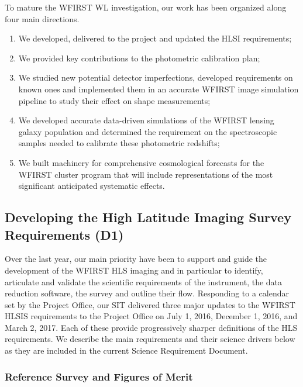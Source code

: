 \begin{summary}
To mature the WFIRST WL investigation, our work has been organized along four main
directions.
\begin{enumerate}
  \item We developed, delivered to the project and
updated the HLSI requirements;
\item We provided key contributions to the
photometric calibration plan;
\item We studied new potential detector imperfections,
developed requirements on known ones and implemented them in an accurate
WFIRST image simulation pipeline to study their effect on shape measurements;
\item We developed accurate data-driven simulations of the WFIRST lensing galaxy population and determined the
requirement on the spectroscopic samples needed to calibrate these photometric redshifts;
\item We built machinery for comprehensive cosmological forecasts for the WFIRST cluster program that
will include representations of the most significant anticipated systematic effects.
\end{enumerate}
\end{summary}


 \subsection{Developing the High Latitude Imaging Survey Requirements (D1)}

 \begin{summaryii}
   Over the last year, our main priority have been to support and guide the
   development of the WFIRST HLS imaging and in particular to identify,
   articulate and validate the scientific requirements of the instrument, the
   data reduction software, the survey and outline their flow. Responding to a calendar set by the
   Project Office, our SIT delivered three major updates to the WFIRST HLSIS
   requirements to the Project Office on July 1, 2016, December 1, 2016, and
   March 2, 2017. Each of these provide progressively sharper definitions of the
   HLS requirements. We describe the main requirements and their science drivers
   below as they are included in the current Science Requirement Document.
 \end{summaryii}

\subsubsection{Reference Survey and Figures of Merit}

